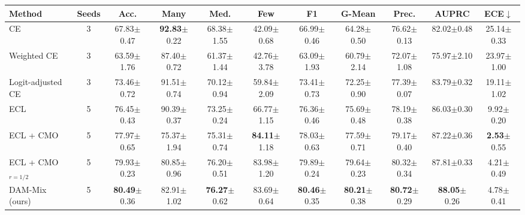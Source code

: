 \begin{tabular}{l c ccccccccc}
\toprule
Method & Seeds & Acc. & Many & Med. & Few & F1 & G-Mean & Prec. & AUPRC & ECE$\downarrow$ \\
\midrule
CE & 3 & 67.83{\scriptsize$\pm$0.47} & \textbf{92.83}{\scriptsize$\pm$0.22} & 68.38{\scriptsize$\pm$1.55} & 42.09{\scriptsize$\pm$0.68} & 66.99{\scriptsize$\pm$0.46} & 64.28{\scriptsize$\pm$0.50} & 76.62{\scriptsize$\pm$0.13} & 82.02{\scriptsize$\pm$0.48} & 25.14{\scriptsize$\pm$0.33} \\
Weighted CE & 3 & 63.59{\scriptsize$\pm$1.76} & 87.40{\scriptsize$\pm$0.72} & 61.37{\scriptsize$\pm$1.44} & 42.76{\scriptsize$\pm$3.78} & 63.09{\scriptsize$\pm$1.93} & 60.79{\scriptsize$\pm$2.14} & 72.07{\scriptsize$\pm$1.08} & 75.97{\scriptsize$\pm$2.10} & 23.97{\scriptsize$\pm$1.00} \\
Logit-adjusted CE & 3 & 73.46{\scriptsize$\pm$0.72} & 91.51{\scriptsize$\pm$0.74} & 70.12{\scriptsize$\pm$0.94} & 59.84{\scriptsize$\pm$2.09} & 73.41{\scriptsize$\pm$0.73} & 72.25{\scriptsize$\pm$0.90} & 77.39{\scriptsize$\pm$0.07} & 83.79{\scriptsize$\pm$0.32} & 19.11{\scriptsize$\pm$1.02} \\
ECL & 5 & 76.45{\scriptsize$\pm$0.43} & 90.39{\scriptsize$\pm$0.37} & 73.25{\scriptsize$\pm$0.24} & 66.77{\scriptsize$\pm$1.15} & 76.36{\scriptsize$\pm$0.46} & 75.69{\scriptsize$\pm$0.48} & 78.19{\scriptsize$\pm$0.38} & 86.03{\scriptsize$\pm$0.30} & 9.92{\scriptsize$\pm$0.20} \\
ECL + CMO & 5 & 77.97{\scriptsize$\pm$0.65} & 75.37{\scriptsize$\pm$1.94} & 75.31{\scriptsize$\pm$0.74} & \textbf{84.11}{\scriptsize$\pm$1.18} & 78.03{\scriptsize$\pm$0.63} & 77.59{\scriptsize$\pm$0.71} & 79.17{\scriptsize$\pm$0.40} & 87.22{\scriptsize$\pm$0.36} & \textbf{2.53}{\scriptsize$\pm$0.55} \\
ECL + CMO$_{r=1/2}$ & 5 & 79.93{\scriptsize$\pm$0.23} & 80.85{\scriptsize$\pm$0.96} & 76.20{\scriptsize$\pm$0.51} & 83.98{\scriptsize$\pm$1.20} & 79.89{\scriptsize$\pm$0.24} & 79.64{\scriptsize$\pm$0.23} & 80.32{\scriptsize$\pm$0.34} & 87.81{\scriptsize$\pm$0.33} & 4.21{\scriptsize$\pm$0.49} \\
\midrule
DAM-Mix (ours) & 5 & \textbf{80.49}{\scriptsize$\pm$0.36} & 82.91{\scriptsize$\pm$1.02} & \textbf{76.27}{\scriptsize$\pm$0.62} & 83.69{\scriptsize$\pm$0.64} & \textbf{80.46}{\scriptsize$\pm$0.35} & \textbf{80.21}{\scriptsize$\pm$0.38} & \textbf{80.72}{\scriptsize$\pm$0.29} & \textbf{88.05}{\scriptsize$\pm$0.26} & 4.78{\scriptsize$\pm$0.41} \\
\bottomrule
\end{tabular}
